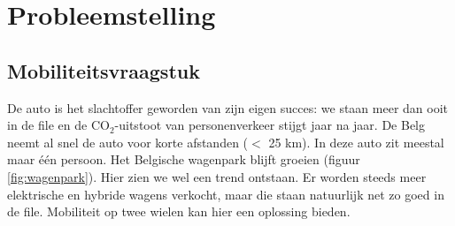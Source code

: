 \chapter{Probleemstelling}
\section{Mobiliteitsvraagstuk}
De auto is het slachtoffer geworden van zijn eigen succes: we staan meer dan ooit in de file en de $\text{CO}_2$-uitstoot van personenverkeer stijgt jaar na jaar. De Belg neemt al snel de auto voor korte afstanden ($<$ 25 km). In deze auto zit meestal maar één persoon. Het Belgische wagenpark blijft groeien (figuur \ref{fig:wagenpark}). Hier zien we wel een trend ontstaan. Er worden steeds meer elektrische en hybride wagens verkocht, maar die staan natuurlijk net zo goed in de file. Mobiliteit op twee wielen kan hier een oplossing bieden.
\\

